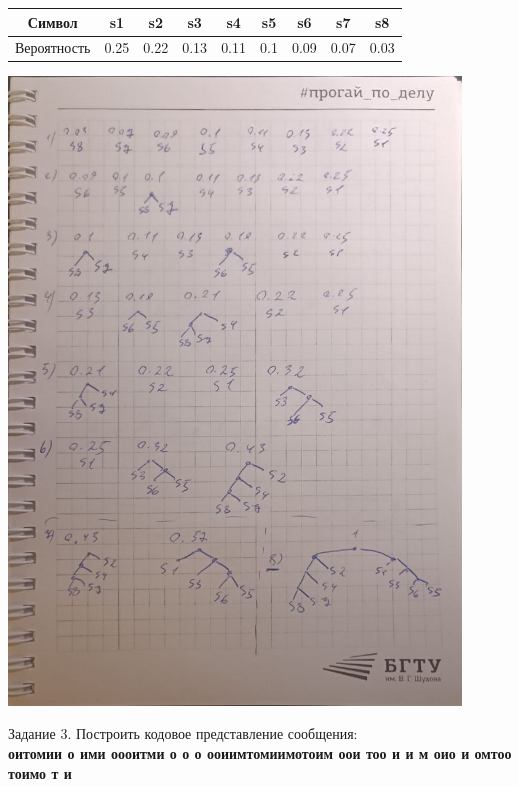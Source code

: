 \documentclass[a4paper,14pt]{extarticle}
\begin{document}
\begin{center}
    \begin{tabular}{|c|c|c|c|c|c|c|c|c|}
        \hline
        Символ      & s1   & s2   & s3   & s4   & s5  & s6   & s7   & s8   \\
        \hline
        Вероятность & 0.25 & 0.22 & 0.13 & 0.11 & 0.1 & 0.09 & 0.07 & 0.03 \\
        \hline
    \end{tabular}
    \includegraphics[width=120mm]{task2.jpg}\\
\end{center}
Задание 3. Построить кодовое представление сообщения:\\
\textbf{оитомии о ими оооитми о о о ооиимтомиимотоим оои тоо и и м оио и омтоо тоимо т и}\\
\end{document}
